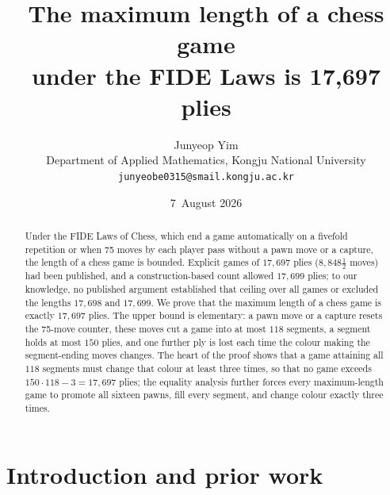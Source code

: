 \documentclass[11pt]{article}
\title{The maximum length of a chess game\\ under the FIDE Laws is 17{,}697 plies}
\author{Junyeop Yim\\[2pt]
  \small Department of Applied Mathematics, Kongju National University\\[1pt]
  \small\texttt{junyeobe0315@smail.kongju.ac.kr}}
\date{7~August 2026}
\theoremstyle{definition}
\theoremstyle{remark}
\theoremstyle{plain}
\begin{document}
\maketitle

\begin{abstract}
Under the FIDE Laws of Chess, which end a game automatically on a fivefold
repetition or when 75 moves by each player pass without a pawn move or a
capture, the length of a chess game is bounded. Explicit games of
$17{,}697$ plies ($8{,}848\tfrac12$ moves) had been published, and a
construction-based count allowed $17{,}699$ plies; to our knowledge, no
published argument established that ceiling over all games or excluded
the lengths $17{,}698$ and $17{,}699$. We prove that
the maximum length of a chess game is exactly $17{,}697$ plies. The upper
bound is elementary: a pawn move or a capture resets the 75-move counter,
these moves cut a game into at most $118$ segments, a segment holds at
most $150$ plies, and one further ply is lost each time the colour making
the segment-ending moves changes. The heart of the proof shows that a
game attaining all $118$ segments must change that colour at least three
times, so that no game exceeds $150 \cdot 118 - 3 = 17{,}697$ plies; the
equality analysis further forces every maximum-length game to promote all
sixteen pawns, fill every segment, and change colour exactly three times.
\end{abstract}

\section{Introduction and prior work}\label{sec:intro}
\end{document}
